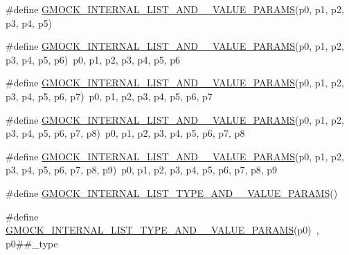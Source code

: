 \begin{DoxyCompactItemize}
\item 
\#define \mbox{\hyperlink{_obj__test_2lib_2googletest-release-1_88_81_2googlemock_2include_2gmock_2gmock-generated-actions_8h_a553114b6d5e3f751a9f122fb71a3abdb}{G\+M\+O\+C\+K\+\_\+\+I\+N\+T\+E\+R\+N\+A\+L\+\_\+\+L\+I\+S\+T\+\_\+\+A\+N\+D\+\_\+\_\+\+V\+A\+L\+U\+E\+\_\+\+P\+A\+R\+A\+MS}}(p0,  p1,  p2,  p3,  p4,  p5)
\item 
\#define \mbox{\hyperlink{_obj__test_2lib_2googletest-release-1_88_81_2googlemock_2include_2gmock_2gmock-generated-actions_8h_a6a66c76963794fca308b7e2852188e06}{G\+M\+O\+C\+K\+\_\+\+I\+N\+T\+E\+R\+N\+A\+L\+\_\+\+L\+I\+S\+T\+\_\+\+A\+N\+D\+\_\+\_\+\+V\+A\+L\+U\+E\+\_\+\+P\+A\+R\+A\+MS}}(p0,  p1,  p2,  p3,  p4,  p5,  p6)~p0, p1, p2, p3, p4, p5, p6
\item 
\#define \mbox{\hyperlink{_obj__test_2lib_2googletest-release-1_88_81_2googlemock_2include_2gmock_2gmock-generated-actions_8h_af9a5e8a55b02e7afac317a2613bd29ec}{G\+M\+O\+C\+K\+\_\+\+I\+N\+T\+E\+R\+N\+A\+L\+\_\+\+L\+I\+S\+T\+\_\+\+A\+N\+D\+\_\+\_\+\+V\+A\+L\+U\+E\+\_\+\+P\+A\+R\+A\+MS}}(p0,  p1,  p2,  p3,  p4,  p5,  p6,  p7)~p0, p1, p2, p3, p4, p5, p6, p7
\item 
\#define \mbox{\hyperlink{_obj__test_2lib_2googletest-release-1_88_81_2googlemock_2include_2gmock_2gmock-generated-actions_8h_a3e91ec053856b1b3c011b71810fb0992}{G\+M\+O\+C\+K\+\_\+\+I\+N\+T\+E\+R\+N\+A\+L\+\_\+\+L\+I\+S\+T\+\_\+\+A\+N\+D\+\_\+\_\+\+V\+A\+L\+U\+E\+\_\+\+P\+A\+R\+A\+MS}}(p0,  p1,  p2,  p3,  p4,  p5,  p6,  p7,  p8)~p0, p1, p2, p3, p4, p5, p6, p7, p8
\item 
\#define \mbox{\hyperlink{_obj__test_2lib_2googletest-release-1_88_81_2googlemock_2include_2gmock_2gmock-generated-actions_8h_a4dbbb45245e68e2f0eaf65d273c8822c}{G\+M\+O\+C\+K\+\_\+\+I\+N\+T\+E\+R\+N\+A\+L\+\_\+\+L\+I\+S\+T\+\_\+\+A\+N\+D\+\_\+\_\+\+V\+A\+L\+U\+E\+\_\+\+P\+A\+R\+A\+MS}}(p0,  p1,  p2,  p3,  p4,  p5,  p6,  p7,  p8,  p9)~p0, p1, p2, p3, p4, p5, p6, p7, p8, p9
\item 
\#define \mbox{\hyperlink{_obj__test_2lib_2googletest-release-1_88_81_2googlemock_2include_2gmock_2gmock-generated-actions_8h_a76ec2981c2b6c52e3c6cdd1eba7f37ac}{G\+M\+O\+C\+K\+\_\+\+I\+N\+T\+E\+R\+N\+A\+L\+\_\+\+L\+I\+S\+T\+\_\+\+T\+Y\+P\+E\+\_\+\+A\+N\+D\+\_\+\_\+\+V\+A\+L\+U\+E\+\_\+\+P\+A\+R\+A\+MS}}()
\item 
\#define \mbox{\hyperlink{_obj__test_2lib_2googletest-release-1_88_81_2googlemock_2include_2gmock_2gmock-generated-actions_8h_aa6b8f71158f750363cbf016eb92e0865}{G\+M\+O\+C\+K\+\_\+\+I\+N\+T\+E\+R\+N\+A\+L\+\_\+\+L\+I\+S\+T\+\_\+\+T\+Y\+P\+E\+\_\+\+A\+N\+D\+\_\+\_\+\+V\+A\+L\+U\+E\+\_\+\+P\+A\+R\+A\+MS}}(p0)~, p0\#\#\+\_\+type

\end{DoxyCompactItemize}
